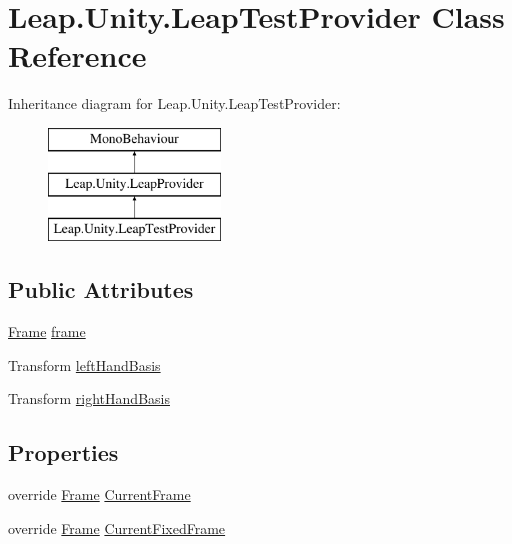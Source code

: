 \hypertarget{class_leap_1_1_unity_1_1_leap_test_provider}{}\section{Leap.\+Unity.\+Leap\+Test\+Provider Class Reference}
\label{class_leap_1_1_unity_1_1_leap_test_provider}
Inheritance diagram for Leap.\+Unity.\+Leap\+Test\+Provider\+:\begin{figure}[H]
\begin{center}
\leavevmode
\includegraphics[height=3.000000cm]{class_leap_1_1_unity_1_1_leap_test_provider}
\end{center}
\end{figure}
\subsection*{Public Attributes}
\begin{DoxyCompactItemize}
\item 
\mbox{\hyperlink{class_leap_1_1_frame}{Frame}} \mbox{\hyperlink{class_leap_1_1_unity_1_1_leap_test_provider_a65afe4c860a20dab61bebb5cd923fc3d}{frame}}
\item 
Transform \mbox{\hyperlink{class_leap_1_1_unity_1_1_leap_test_provider_a6eaf2a38be2f0ec5b2f7f0d00d7926f2}{left\+Hand\+Basis}}
\item 
Transform \mbox{\hyperlink{class_leap_1_1_unity_1_1_leap_test_provider_a52cd1a389ba349c4866fb9da879fad35}{right\+Hand\+Basis}}
\end{DoxyCompactItemize}
\subsection*{Properties}
\begin{DoxyCompactItemize}
\item 
override \mbox{\hyperlink{class_leap_1_1_frame}{Frame}} \mbox{\hyperlink{class_leap_1_1_unity_1_1_leap_test_provider_a164a6a68635fa3665c4c9c75156d3374}{Current\+Frame}}
\item 
override \mbox{\hyperlink{class_leap_1_1_frame}{Frame}} \mbox{\hyperlink{class_leap_1_1_unity_1_1_leap_test_provider_a207745bc4f21181bbb6a6d6c10fdfeb0}{Current\+Fixed\+Frame}}
\end{DoxyCompactItemize}
